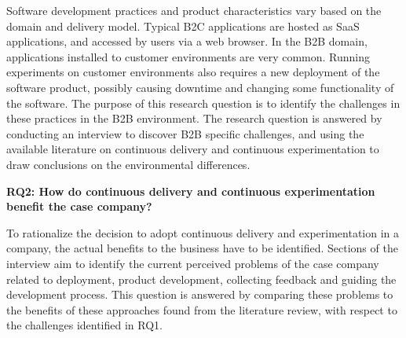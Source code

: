 \documentclass[english]{tktltiki2}
\theoremstyle{definition}
\theoremstyle{remark}
\begin{document}
\noindent Software development practices and product characteristics vary based on the domain and delivery model. Typical B2C applications are hosted as SaaS applications, and accessed by users via a web browser. In the B2B domain, applications installed to customer environments are very common. Running experiments on customer environments also requires a new deployment of the software product, possibly causing downtime and changing some functionality of the software. The purpose of this research question is to identify the challenges in these practices in the B2B environment. The research question is answered by conducting an interview to discover B2B specific challenges, and using the available literature on continuous delivery and continuous experimentation to draw conclusions on the environmental differences.
\newline




\noindent \textbf{RQ2: How do continuous delivery and continuous experimentation benefit the case company?} %

\noindent To rationalize the decision to adopt continuous delivery and experimentation in a company, the actual benefits to the business have to be identified. Sections of the interview aim to identify the current perceived problems of the case company related to deployment, product development, collecting feedback and guiding the development process. This question is answered by comparing these problems to the benefits of these approaches found from the literature review, with respect to the challenges identified in RQ1.
\newline
\end{document}
